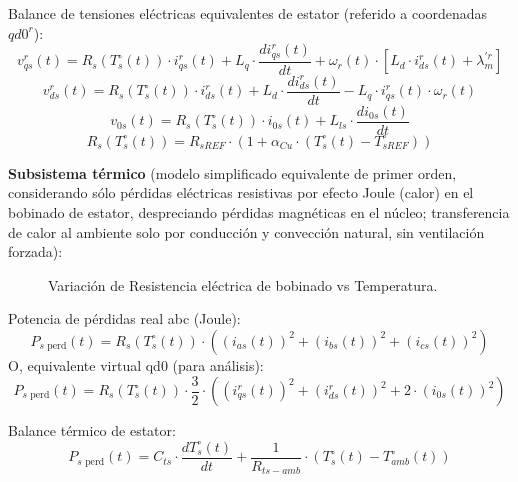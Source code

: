 \documentclass[11pt,a4paper]{article}
\begin{document}
\noindent Balance de tensiones eléctricas equivalentes de estator (referido a coordenadas $qd0^r$):
\begin{equation}
v_{qs}^r(t) = R_s(T_s^\circ(t)) \cdot i_{qs}^r(t) + L_q \cdot \frac{di_{qs}^r(t)}{dt} + \omega_r(t) \cdot \left[ L_d \cdot i_{ds}^r(t) + \lambda_m^{\prime r} \right] \tag{Ec. 3.6}
\end{equation}
\begin{equation}
v_{ds}^r(t) = R_s(T_s^\circ(t)) \cdot i_{ds}^r(t) + L_d \cdot \frac{di_{ds}^r(t)}{dt} - L_q \cdot i_{qs}^r(t) \cdot \omega_r(t) \tag{Ec. 3.7}
\end{equation}
\begin{equation}
v_{0s}(t) = R_s(T_s^\circ(t)) \cdot i_{0s}(t) + L_{ls} \cdot \frac{di_{0s}(t)}{dt} \tag{Ec. 3.8}
\end{equation}
\begin{equation}
R_s(T_s^\circ(t)) = R_{sREF} \cdot (1 + \alpha_{Cu} \cdot (T_s^\circ(t) - T_{sREF}^\circ)) \tag{Ec. 3.9}
\end{equation}

\textbf{Subsistema térmico} (modelo simplificado equivalente de primer orden, considerando sólo pérdidas eléctricas resistivas por efecto Joule (calor) en el bobinado de estator, despreciando pérdidas magnéticas en el núcleo; transferencia de calor al ambiente solo por conducción y convección natural, sin ventilación forzada):

\begin{figure}[H]
    \centering
    \fbox{\rule{0pt}{3cm} \rule{0.8\textwidth}{0pt}}
    \caption{Variación de Resistencia eléctrica de bobinado vs Temperatura.}
\end{figure}

Potencia de pérdidas real abc (Joule): 
\begin{equation}
P_{s \text{ perd}}(t) = R_s(T_s^\circ(t)) \cdot ((i_{as}(t))^2 + (i_{bs}(t))^2 + (i_{cs}(t))^2) \tag{Ec. 3.10}
\end{equation}
O, equivalente virtual qd0 (para análisis):
\begin{equation}
P_{s \text{ perd}}(t) = R_s(T_s^\circ(t)) \cdot \frac{3}{2} \cdot \left( (i_{qs}^r(t))^2 + (i_{ds}^r(t))^2 + 2 \cdot (i_{0s}(t))^2 \right) \tag{Ec. 3.11}
\end{equation}

Balance térmico de estator:
\begin{equation}
P_{s \text{ perd}}(t) = C_{ts} \cdot \frac{dT_s^\circ(t)}{dt} + \frac{1}{R_{ts-amb}} \cdot (T_s^\circ(t) - T_{amb}^\circ(t)) \tag{Ec. 3.12}
\end{equation}
\end{document}
